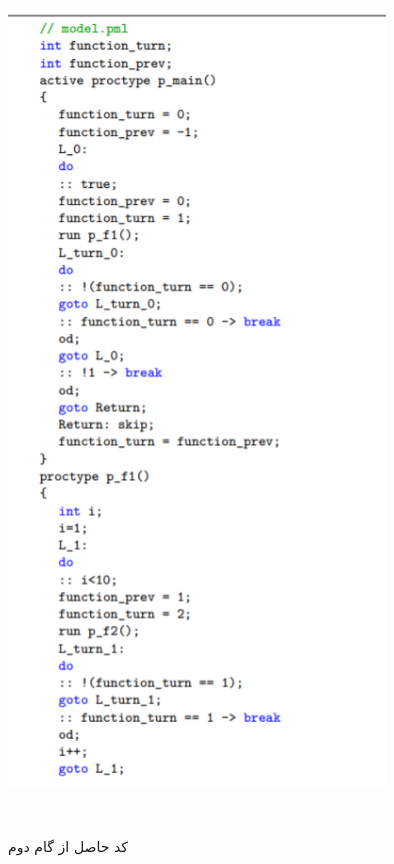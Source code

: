 \begin{figure}
	\centering
	\includegraphics[height=23cm,width=10cm]{j1.png}
	\caption{کد حاصل از گام دوم}
	\centering
\end{figure}

